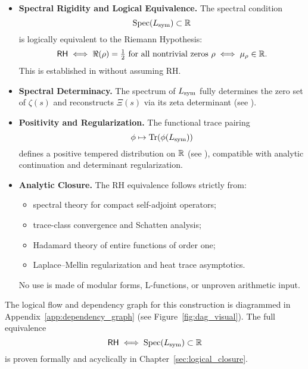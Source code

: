 \begin{itemize}
  \item \textbf{Spectral Rigidity and Logical Equivalence.}  
  The spectral condition
  \[
  \operatorname{Spec}(L_{\mathrm{sym}}) \subset \mathbb{R}
  \]
  is logically equivalent to the Riemann Hypothesis:
  \[
  \mathsf{RH} \iff \Re(\rho) = \tfrac{1}{2} \text{ for all nontrivial zeros } \rho \iff \mu_\rho \in \mathbb{R}.
  \]
  This is established in  without assuming RH.

  \item \textbf{Spectral Determinacy.}  
  The spectrum of \( L_{\mathrm{sym}} \) fully determines the zero set of \( \zeta(s) \) and reconstructs \( \Xi(s) \) via its zeta determinant (see ).

  \item \textbf{Positivity and Regularization.}  
  The functional trace pairing
  \[
  \phi \mapsto \operatorname{Tr}(\phi(L_{\mathrm{sym}}))
  \]
  defines a positive tempered distribution on \( \mathbb{R} \) (see ), compatible with analytic continuation and determinant regularization.

  \item \textbf{Analytic Closure.}  
  The RH equivalence follows strictly from:
  \begin{itemize}
    \item spectral theory for compact self-adjoint operators;
    \item trace-class convergence and Schatten analysis;
    \item Hadamard theory of entire functions of order one;
    \item Laplace–Mellin regularization and heat trace asymptotics.
  \end{itemize}
  No use is made of modular forms, L-functions, or unproven arithmetic input.
\end{itemize}

\medskip

The logical flow and dependency graph for this construction is diagrammed in Appendix~\ref{app:dependency_graph} (see Figure~\ref{fig:dag_visual}). The full equivalence
\[
\mathsf{RH} \iff \operatorname{Spec}(L_{\mathrm{sym}}) \subset \mathbb{R}
\]
is proven formally and acyclically in Chapter~\ref{sec:logical_closure}.
